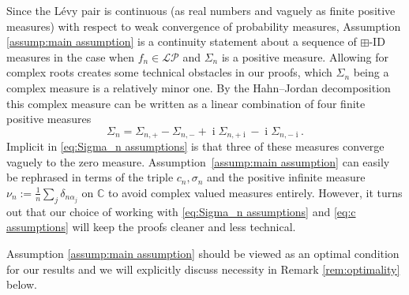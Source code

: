 \documentclass[reqno]{amsart}
\newcommand{\1}{\mathbf{1}}
\DeclareMathOperator{\ii}{i}
\newcommand{\C}{\mathbb{C}}
\newcommand{\LP}{\mathcal{LP}}
\theoremstyle{plain}
\theoremstyle{definition}
\theoremstyle{remark}
\numberwithin{equation}{section}
\begin{document}
   Since the L\'evy pair is continuous (as real numbers and vaguely as finite positive measures) with respect to weak convergence of probability measures, Assumption \ref{assump:main assumption} is a continuity statement about a sequence of $\boxplus$-ID measures in the case when $f_{n}\in\LP$ and $\Sigma_n$ is a positive measure. Allowing for complex roots creates some technical obstacles in our proofs, which $\Sigma_{n}$ being a complex measure is a relatively minor one. By the Hahn--Jordan decomposition this complex measure can be written as a linear combination of four finite positive measures \begin{equation*}
   	\Sigma_n=\Sigma_{n,+}-\Sigma_{n,-}+\ii\Sigma_{n,+\ii}-\ii\Sigma_{n,-\ii}.
   \end{equation*} Implicit in \eqref{eq:Sigma_n assumptions} is that three of these measures converge vaguely to the zero measure. 
   Assumption~\ref{assump:main assumption} can easily be rephrased in terms of the triple $c_{n}, \sigma_{n}$ and the positive infinite measure $\nu_n:=\frac{1}{n}\sum_{j}\delta_{n\alpha_{j}}$ on $\C$ to avoid complex valued measures entirely. However, it turns out that our choice of working with \eqref{eq:Sigma_n assumptions} and \eqref{eq:c assumptions} will keep the proofs cleaner and less technical. %
   
   Assumption \ref{assump:main assumption} should be viewed as an optimal condition for our results and we will explicitly discuss necessity in Remark \ref{rem:optimality} below.%


\end{document}
